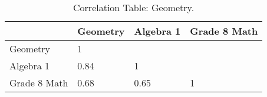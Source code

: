 \begin{table}[!tbp]
\caption{Correlation Table: Geometry.\label{}} 
\begin{center}
\begin{tabular}{llll}
\hline\hline
\multicolumn{1}{l}{}&\multicolumn{1}{c}{Geometry}&\multicolumn{1}{c}{Algebra 1}&\multicolumn{1}{c}{Grade 8 Math}\tabularnewline
\hline
Geometry&1&&\tabularnewline
Algebra 1&0.84&1&\tabularnewline
Grade 8 Math&0.68&0.65&1\tabularnewline
\hline
\end{tabular}\end{center}
\end{table}

